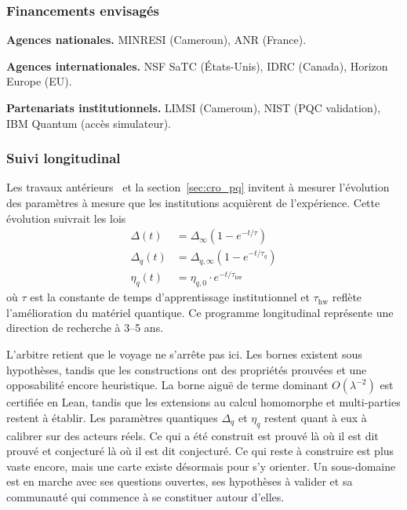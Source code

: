 \begin{sloppypar}
\subsubsection{Financements envisag\'es}
\label{subsubsec:financements_envisages}

\noindent\textbf{Agences nationales.} MINRESI (Cameroun), ANR (France).

\noindent\textbf{Agences internationales.} NSF SaTC (\'Etats-Unis), IDRC
(Canada), Horizon Europe (EU).

\noindent\textbf{Partenariats institutionnels.} LIMSI (Cameroun), NIST (PQC
validation), IBM Quantum (acc\`es simulateur).

\subsubsection{Suivi longitudinal}
\label{subsubsec:suivi_longitudinal}

Les travaux ant\'erieurs~\cite{MINKA2026CRO} et la
section~\ref{sec:cro_pq} invitent \`a
mesurer l'\'evolution des param\`etres \`a mesure que les institutions
acqui\`erent de l'exp\'erience. Cette \'evolution suivrait les lois
\begin{align}
\Delta(t) &= \Delta_\infty(1 - e^{-t/\tau})
\label{eq:suivi_delta} \\
\Delta_q(t) &= \Delta_{q,\infty}(1 - e^{-t/\tau_q})
\label{eq:suivi_delta_q} \\
\eta_q(t) &= \eta_{q,0} \cdot e^{-t/\tau_{\mathrm{hw}}}
\label{eq:suivi_eta_q}
\end{align}
o\`u $\tau$ est la constante de temps d'apprentissage institutionnel et
$\tau_{\mathrm{hw}}$ refl\`ete l'am\'elioration du mat\'eriel quantique. Ce
programme longitudinal repr\'esente une direction de recherche \`a 3--5 ans.
\end{sloppypar}

\begin{boiteArbitre}
L'arbitre retient que le voyage ne s'arr\^ete pas ici. Les bornes existent
sous hypoth\`eses, tandis que les constructions ont des propri\'et\'es prouv\'ees et une
opposabilit\'e encore heuristique. La borne aigu\"e de terme dominant
$O(\lambda^{-2})$ est certifi\'ee en Lean, tandis que les extensions au calcul homomorphe
et multi-parties restent \`a \'etablir. Les param\`etres quantiques
$\Delta_q$ et $\eta_q$ restent quant \`a eux \`a calibrer sur des acteurs r\'eels. Ce qui a
\'et\'e construit est prouv\'e l\`a o\`u il est dit prouv\'e et conjectur\'e l\`a o\`u il est dit conjectur\'e.
Ce qui reste \`a construire est plus vaste encore, mais une carte existe d\'esormais pour s'y orienter.
Un sous-domaine est en marche avec ses questions ouvertes, ses hypoth\`eses
\`a valider et sa communaut\'e qui commence \`a se constituer autour d'elles.
\end{boiteArbitre}